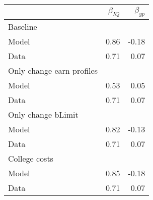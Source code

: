 \begin{tabular}{lrr}
\hline
  & $\beta_{IQ}$  & $\beta_{yp}$  \\
\hline
Baseline &   &   \\
Model & 0.86  & -0.18  \\
Data & 0.71  & 0.07  \\
Only change earn profiles &   &   \\
Model & 0.53  & 0.05  \\
Data & 0.71  & 0.07  \\
Only change bLimit &   &   \\
Model & 0.82  & -0.13  \\
Data & 0.71  & 0.07  \\
College costs &   &   \\
Model & 0.85  & -0.18  \\
Data & 0.71  & 0.07  \\
\hline
\end{tabular}%
